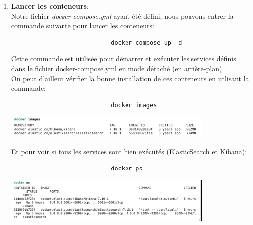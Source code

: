 \documentclass[a4paper,11pt]{article}
\begin{document}
\begin{enumerate}
                \item \textbf{Lancer les conteneurs}:\\
                    \noindent Notre fichier \textit{docker-compose.yml} ayant été défini, nous pouvons entrer la commande suivante pour lancer les conteneurs:
                    \begin{tcolorbox}[colback=lightgray!6, colframe=black, left=-30mm, right=5mm, top=2mm, bottom=-2mm, boxrule=0.1mm]
                        \begin{verbatim}
                            docker-compose up -d
                        \end{verbatim}
                    \end{tcolorbox}
                    \noindent Cette commande est utilisée pour démarrer et exécuter les services définis dans le fichier docker-compose.yml en mode détaché (en arrière-plan).\\
                    \noindent On peut d'ailleur vérifier la bonne installation de ces conteneurs en utlisant la commande: 
                    \begin{tcolorbox}[colback=lightgray!6, colframe=black, left=-30mm, right=5mm, top=2mm, bottom=-2mm, boxrule=0.1mm]
                        \begin{verbatim}
                            docker images
                        \end{verbatim}
                    \end{tcolorbox}
                    \includegraphics[width=0.8\textwidth]{CHAPITRE-4/4.3-BONUS/screenshots/screen1.png}

                    \noindent Et pour voir si tous les services sont bien exécutés (ElasticSearch et Kibana):
                    \begin{tcolorbox}[colback=lightgray!6, colframe=black, left=-30mm, right=5mm, top=2mm, bottom=-2mm, boxrule=0.1mm]
                        \begin{verbatim}
                            docker ps
                        \end{verbatim}
                    \end{tcolorbox}
                    \includegraphics[width=0.8\textwidth]{CHAPITRE-4/4.3-BONUS/screenshots/screen2.png}


\end{enumerate}
\end{document}
